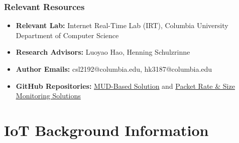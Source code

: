

\subsubsection{Relevant Resources}
\begin{itemize}
    \item \textbf{Relevant Lab:} Internet Real-Time Lab (IRT), Columbia University Department of Computer Science
    \item \textbf{Research Advisors:} Luoyao Hao, Henning Schulzrinne
    \item \textbf{Author Emails:} csl2192@columbia.edu, hk3187@columbia.edu
    \item \textbf{GitHub Repositories:} \href{https://github.com/Halleloya/IoTFirewall/tree/mud}{\underline{MUD-Based Solution}} and \href{https://github.com/Halleloya/IoTFirewall/tree/fall_2023}{\underline{Packet Rate \& Size Monitoring Solutions}}    
\end{itemize}


\pagebreak
\section{IoT Background Information}
